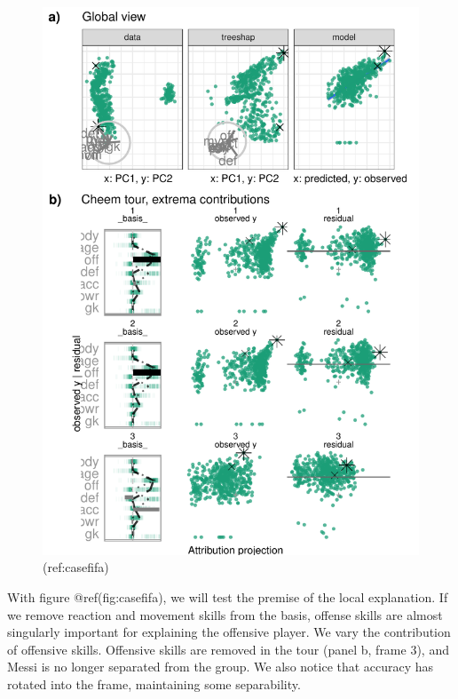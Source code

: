 \documentclass[
]{article}
\begin{document}
\begin{figure}

{\centering \includegraphics[width=1\linewidth]{./figures/case_fifa} 

}

\caption{(ref:casefifa)}\label{fig:casefifa}
\end{figure}

With figure @ref(fig:casefifa), we will test the premise of the local
explanation. If we remove reaction and movement skills from the basis,
offense skills are almost singularly important for explaining the
offensive player. We vary the contribution of offensive skills.
Offensive skills are removed in the tour (panel b, frame 3), and Messi
is no longer separated from the group. We also notice that accuracy has
rotated into the frame, maintaining some separability.
\end{document}
